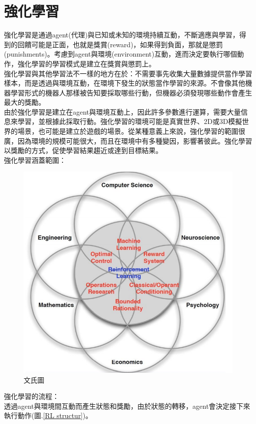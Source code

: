 \documentclass[14pt,a4paper]{report}  %
\begin{document}
\section{強化學習}
強化學習是通過agent(代理)與已知或未知的環境持續互動，不斷適應與學習，得到的回饋可能是正面，也就是獎賞(reward)，如果得到負面，那就是懲罰(punishments)。考慮到agent與環境(environment)互動，進而決定要執行哪個動作，強化學習的學習模式是建立在獎賞與懲罰上。\\
強化學習與其他學習法不一樣的地方在於：不需要事先收集大量數據提供當作學習樣本，而是透過與環境互動，在環境下發生的狀態當作學習的來源。不會像其他機器學習形式的機器人那樣被告知要採取哪些行動，但機器必須發現哪些動作會產生最大的獎勵。\\
由於強化學習是建立在agent與環境互動上，因此許多參數進行運算，需要大量信息來學習，並根據此採取行動。強化學習的環境可能是真實世界、2D或3D模擬世界的場景，也可能是建立於遊戲的場景。從某種意義上來說，強化學習的範圍很廣，因為環境的規模可能很大，而且在環境中有多種變因，影響著彼此。強化學習以獎勵的方式，促使學習結果趨近或達到目標結果。\\
強化學習涵蓋範圍：\\

\begin{figure}[hbt!]
\begin{center}
\includegraphics[scale=0.6]{Faces_of_Reinforcement_Learning}
\caption{\Large 文氏圖}
\label{文氏圖}
\end{center}
\end{figure}
強化學習的流程：\\
透過agent與環境間互動而產生狀態和獎勵，由於狀態的轉移，agent會決定接下來執行動作(圖.\ref{RL structur})。\\[12pt]
\end{document}
